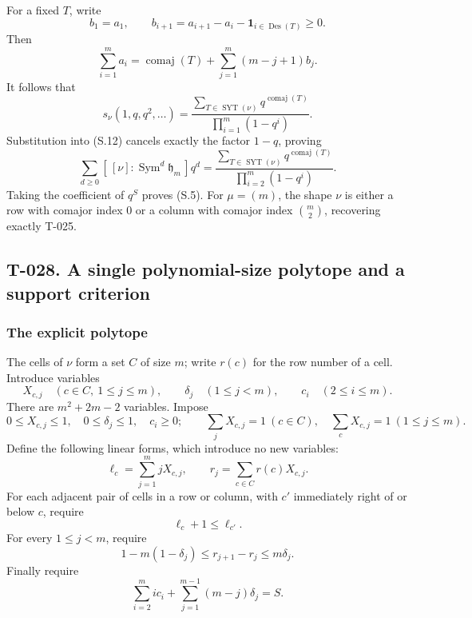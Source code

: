 \documentclass[
  10pt,
]{article}
\begin{document}
For a fixed \(T\), write \[
b_1=a_1,\qquad b_{i+1}=a_{i+1}-a_i-\mathbf1_{i\in\operatorname{Des}(T)}\ge0.
\] Then \[
\sum_{i=1}^m a_i
=\operatorname{comaj}(T)+\sum_{j=1}^m(m-j+1)b_j.
\tag{S.14}
\] It follows that \[
s_\nu(1,q,q^2,\ldots)
=\frac{\sum_{T\in\operatorname{SYT}(\nu)}q^{\operatorname{comaj}(T)}}
{\prod_{i=1}^m(1-q^i)}.
\tag{S.15}
\] Substitution into (S.12) cancels exactly the factor \(1-q\), proving
\[
\sum_{d\ge0}[\,[\nu]:\operatorname{Sym}^d\mathfrak h_m\,]q^d
=\frac{\sum_{T\in\operatorname{SYT}(\nu)}q^{\operatorname{comaj}(T)}}
{\prod_{i=2}^m(1-q^i)}.
\tag{S.16}
\] Taking the coefficient of \(q^S\) proves (S.5). For \(\mu=(m)\), the
shape \(\nu\) is either a row with comajor index 0 or a column with
comajor index \(\binom m2\), recovering exactly T-025.

\subsection{T-028. A single polynomial-size polytope and a support
criterion}\label{t-028.-a-single-polynomial-size-polytope-and-a-support-criterion}

\subsubsection{The explicit polytope}\label{the-explicit-polytope}

The cells of \(\nu\) form a set \(C\) of size \(m\); write \(r(c)\) for
the row number of a cell. Introduce variables \[
X_{c,j}\quad(c\in C,\ 1\le j\le m),\qquad
\delta_j\quad(1\le j<m),\qquad
c_i\quad(2\le i\le m).
\] There are \(m^2+2m-2\) variables. Impose \[
0\le X_{c,j}\le1,\quad0\le\delta_j\le1,\quad c_i\ge0;
\qquad
\sum_jX_{c,j}=1\ (c\in C),\quad
\sum_cX_{c,j}=1\ (1\le j\le m).
\tag{S.17}
\] Define the following linear forms, which introduce no new variables:
\[
\ell_c=\sum_{j=1}^m jX_{c,j},\qquad
r_j=\sum_{c\in C}r(c)X_{c,j}.
\tag{S.18}
\] For each adjacent pair of cells in a row or column, with \(c'\)
immediately right of or below \(c\), require \[
\ell_c+1\le\ell_{c'}.
\tag{S.19}
\] For every \(1\le j<m\), require \[
1-m(1-\delta_j)\le r_{j+1}-r_j\le m\delta_j.
\tag{S.20}
\] Finally require \[
\sum_{i=2}^m i c_i+\sum_{j=1}^{m-1}(m-j)\delta_j=S.
\tag{S.21}
\]
\end{document}
